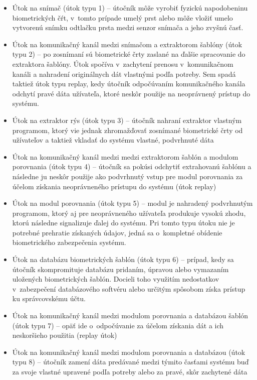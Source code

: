 \begin{itemize}

\item{Útok na snímač (útok typu 1) – útočník môže vyrobiť fyzickú napodobeninu biometrických čŕt, v~tomto prípade umelý prst alebo môže vložiť umelo vytvorenú snímku odtlačku prsta medzi senzor snímača a jeho zvyšnú časť.
}

\item{Útok na komunikačný kanál medzi snímačom a extraktorom šablóny (útok typu 2) – po zosnímaní sú biometrické črty zaslané na ďalšie spracovanie do extraktora šablóny. Útok spočíva v~zachytení prenosu v~komunikačnom kanáli a nahradení originálnych dát vlastnými podľa potreby. Sem spadá taktiež útok typu replay, kedy útočník odpočúvaním komunikačného kanála odchytí pravé dáta užívateľa, ktoré neskôr použije na neoprávnený prístup do systému.
}

\item{Útok na extraktor rýs (útok typu 3) – útočník nahraní extraktor vlastným programom, ktorý vie jednak zhromažďovať zosnímané biometrické črty od užívateľov a taktiež vkladať do systému vlastné, podvrhnuté dáta

}

\item{Útok na komunikačný kanál medzi medzi extraktorom šablón a modulom porovnania (útok typu 4) – útočník sa pokúsi odchytiť extrahovanú šablónu a následne ju neskôr použije ako podvrhnutý vstup pre modul porovnania za účelom získania neoprávneného prístupu do systému (útok replay)
}

\item{Útok na modul porovnania (útok typu 5) – modul je nahradený podvrhnutým programom, ktorý aj pre neoprávneného užívateľa produkuje vysokú zhodu, ktorú následne signalizuje ďalej do systému. Pri tomto typu útoku nie je potrebné prehratie získaných údajov, jedná sa o~kompletné obídenie biometrického zabezpečenia systému.
}

\item{Útok na databázu biometrických šablón (útok typu 6) – prípad, kedy sa útočník skompromituje databázu pridaním, úpravou alebo vymazaním uložených biometrických šablón. Docieli toho využitím nedostatkov v~zabezpečení databázového softvéru alebo určitým spôsobom získa prístup ku správcovskému účtu.
}

\item{Útok na komunikačný kanál medzi modulom porovnania a databázou šablón (útok typu 7) – opäť ide o~odpočúvanie za účelom získania dát a ich neskoršieho použitia (replay útok)
}

\item{Útok na komunikačný kanál medzi modulom porovnania a databázou (útok typu 8) – útočník zamení dáta predávané medzi týmito časťami systému buď za svoje vlastné upravené podľa potreby alebo za pravé, skôr zachytené dáta
}
\end{itemize}



